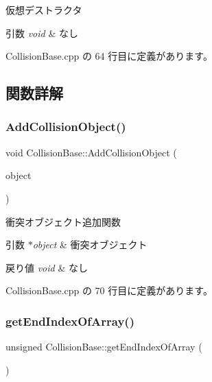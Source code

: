 仮想デストラクタ 


\begin{DoxyParams}{引数}
{\em void} & なし \\
\hline
\end{DoxyParams}


 Collision\+Base.\+cpp の 64 行目に定義があります。



\subsection{関数詳解}
\mbox{\label{class_collision_base_a058c13832483ec037896b11d4f2cc563}} 
\subsubsection{\texorpdfstring{Add\+Collision\+Object()}{AddCollisionObject()}}
{\footnotesize\ttfamily void Collision\+Base\+::\+Add\+Collision\+Object (\begin{DoxyParamCaption}\item[{\mbox{\hyperlink{class_collision_object}{Collision\+Object}} $\ast$}]{object }\end{DoxyParamCaption})}



衝突オブジェクト追加関数 


\begin{DoxyParams}{引数}
{\em $\ast$object} & 衝突オブジェクト \\
\hline
\end{DoxyParams}

\begin{DoxyRetVals}{戻り値}
{\em void} & なし \\
\hline
\end{DoxyRetVals}


 Collision\+Base.\+cpp の 70 行目に定義があります。

\mbox{\label{class_collision_base_ac1d7000c820fabfa604138cda30a40a1}} 
\subsubsection{\texorpdfstring{get\+End\+Index\+Of\+Array()}{getEndIndexOfArray()}}
{\footnotesize\ttfamily unsigned Collision\+Base\+::get\+End\+Index\+Of\+Array (\begin{DoxyParamCaption}{ }\end{DoxyParamCaption})}



